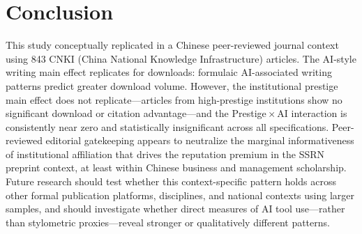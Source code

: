 \documentclass[12pt,a4paper]{article}
\begin{document}
\section{Conclusion}
\label{sec:conclusion}

This study conceptually replicated \citet{JoLi2026} in a Chinese
peer-reviewed journal context using 843 CNKI
(China National Knowledge Infrastructure) articles.
The AI-style writing main effect replicates for downloads: formulaic
AI-associated writing patterns predict greater download volume.
However, the institutional prestige main effect does not replicate---articles
from high-prestige institutions show no significant download or citation
advantage---and the Prestige\,$\times$\,AI interaction is consistently
near zero and statistically insignificant across all specifications.
Peer-reviewed editorial gatekeeping appears to neutralize the marginal
informativeness of institutional affiliation that drives the reputation
premium in the SSRN preprint context, at least within Chinese business
and management scholarship.
Future research should test whether this context-specific pattern holds
across other formal publication platforms, disciplines, and national
contexts using larger samples, and should investigate whether direct
measures of AI tool use---rather than stylometric proxies---reveal
stronger or qualitatively different patterns.
\end{document}
